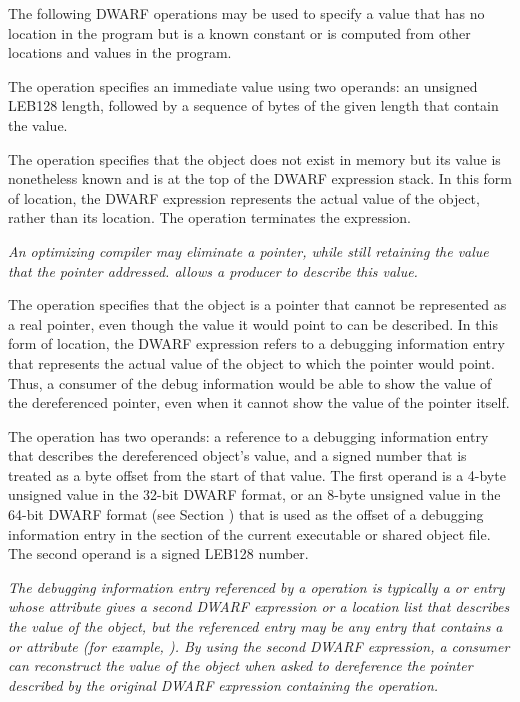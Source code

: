 The following DWARF operations may be used to specify a value that has
no location in the program but is a known constant or is computed from
other locations and values in the program.
\begin{enumerate}[1. ]
\itembfnl{\DWOPimplicitvalueTARG}
The \DWOPimplicitvalueNAME{} operation specifies an immediate value
using two operands: an unsigned LEB128
length, followed by a
sequence of bytes of the given length that contain the value.

\itembfnl{\DWOPstackvalueTARG}
The \DWOPstackvalueNAME{} operation specifies that the object does not
exist in memory but its value is nonetheless known and is at the top
of the DWARF expression stack. In this form of location, the DWARF
expression represents the actual value of the object, rather than its
location. The \DWOPstackvalueNAME{} operation terminates the
expression.

\itembfnl{\DWOPimplicitpointerTARG}
\textit{An optimizing compiler may eliminate a pointer, while
still retaining the value that the pointer addressed.
\DWOPimplicitpointerNAME{} allows a producer to describe this value.}

The \DWOPimplicitpointerNAME{} operation specifies that the object is
a pointer that cannot be represented as a real pointer, even though
the value it would point to can be described. In this form of
location, the DWARF expression refers to a debugging information entry
that represents the actual value of the object to which the pointer
would point. Thus, a consumer of the debug information would be able
to show the value of the dereferenced pointer, even when it cannot
show the value of the pointer itself.

The \DWOPimplicitpointerNAME{} operation has two operands: a
reference to a debugging information entry that describes
the dereferenced object's value, and a signed number that
is treated as a byte offset from the start of that value.
The first operand is a 4-byte unsigned value in the 32-bit
DWARF format, or an 8-byte unsigned value in the 64-bit
DWARF format (see Section
)
\bb
that is used as the offset of a debugging information entry
in the \dotdebuginfo{} section of the current executable
or shared object file.
\eb
The second operand is a
signed LEB128 number.
\db

\textit{The debugging information entry referenced by a
\DWOPimplicitpointerNAME{} operation is typically a
\DWTAGvariable{} or \DWTAGformalparameter{} entry whose
\DWATlocation{} attribute gives a second DWARF expression or a
location list that describes the value of the object, but the
referenced entry may be any entry that contains a \DWATlocation{}
or \DWATconstvalue{} attribute (for example, \DWTAGdwarfprocedure).
By using the second DWARF expression, a consumer can
reconstruct the value of the object when asked to dereference
the pointer described by the original DWARF expression
containing the \DWOPimplicitpointer{} operation.}


\end{enumerate}

